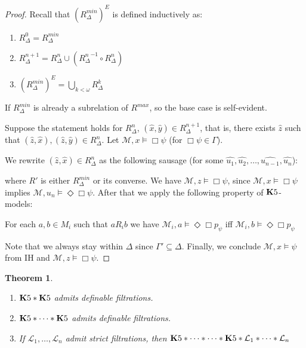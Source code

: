 \documentclass[a4paper]{article}
\theoremstyle{defin}
\theoremstyle{theorem}
\newtheorem{theorem}{Theorem}
\theoremstyle{prop}
\theoremstyle{lemma}
\theoremstyle{fact}
\theoremstyle{ex}
\theoremstyle{col}
\theoremstyle{claim}
\begin{document}
\begin{proof}
  Recall that $(R^{min}_{\Delta})^{E}$ is defined inductively as:
  \begin{enumerate}
    \item $R_{\Delta}^{0} = R_{\Delta}^{min}$
    \item $R_{\Delta}^{n + 1} = R_{\Delta}^{n} \cup ({R_{\Delta}^{n}}^{-1} \circ R_{\Delta}^{n})$
    \item $(R^{min}_{\Delta})^{E} = \bigcup_{k < \omega} R_{\Delta}^{k}$
  \end{enumerate}

  If $R^{min}_{\Delta}$ is already a subrelation of $R^{max}$, so the base case is self-evident.

  Suppose the statement holds for $R_{\Delta}^{n}$, $(\hat{x},\hat{y}) \in R_{\Delta}^{n + 1}$, that is, there exists $\hat{z}$ such that $(\hat{z}, \hat{x}), (\hat{z}, \hat{y}) \in R_{\Delta}^{n}$.
  Let $\mathcal{M}, x \models \Box \psi$ (for $\Box \psi \in \Gamma$).

  We rewrite $(\hat{z}, \hat{x}) \in R_{\Delta}^{n}$ as the following sausage (for some $\widehat{u_1},  \widehat{u_2}, \dots, \widehat{u_{n - 1}}, \widehat{u_{n}}$):

  where $R'$ is either $R_{\Delta}^{min}$ or its converse. We have $\mathcal{M}, z \models \Box \psi$, since $\mathcal{M}, x \models \Box \psi$ implies $\mathcal{M}, u_{n} \models \Diamond \Box \psi$. After that we apply the following property of ${\bf K}5$-models:
  \begin{center}
    For each $a, b \in M_i$ such that $a R_i b$ we have $\mathcal{M}_i, a \models \Diamond \Box p_{\psi}$ iff $\mathcal{M}_i, b \models \Diamond \Box p_{\psi}$
  \end{center}
  Note that we always stay within $\Delta$ since $\Gamma' \subseteq \Delta$.
  Finally, we conclude $\mathcal{M}, x \models \psi$ from IH and $\mathcal{M}, z \models \Box \psi$.
\end{proof}

\begin{theorem}
  $ $

  \begin{enumerate}
  \item ${\bf K}5 * {\bf K}5$ admits definable filtrations.
  \item ${\bf K}5 * \dots * {\bf K}5$ admits definable filtrations.
  \item If $\mathcal{L}_1, \dots, \mathcal{L}_n$ admit strict filtrations, then ${\bf K}5 * \dots * \dots * {\bf K}5 * \mathcal{L}_1 * \dots * \mathcal{L}_n$
  \end{enumerate}
\end{theorem}
\end{document}

